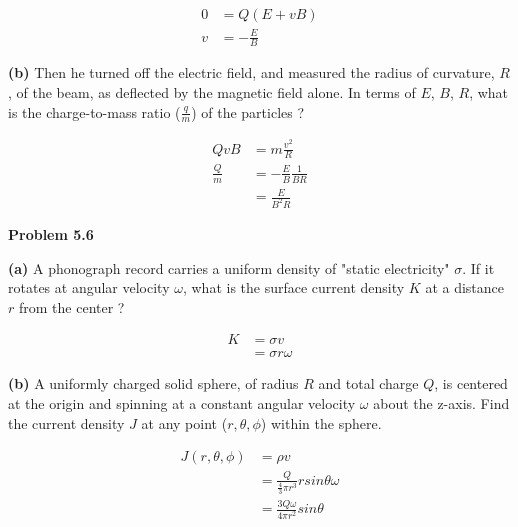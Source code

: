 \documentclass{article}
\begin{document}
\begin{equation*}
\begin{split}
	0 & = Q (E + vB) \\
	v & = \boxed{- \frac{E}{B}}
\end{split}
\end{equation*}

\textbf{(b)}
Then he turned off the electric field, and measured the radius of curvature, $R$, of the beam, as deflected by the magnetic field alone.
In terms of $E$, $B$, $R$, what is the charge-to-mass ratio ($\frac{q}{m}$) of the particles ?

\begin{equation*}
\begin{split}
	QvB & = m \frac{v^2}{R} \\
	\frac{Q}{m} & = - \frac{E}{B} \frac{1}{B R} \\
	& = \boxed{\frac{E}{B^2 R}}
\end{split}
\end{equation*}

\textbf{Problem 5.6}

\textbf{(a)}
A phonograph record carries a uniform density of "static electricity" $\sigma$.
If it rotates at angular velocity $\omega$, what is the surface current density $K$ at a distance $r$ from the center ?

\begin{equation*}
\begin{split}
	K & = \sigma v \\
	& = \boxed{\sigma r \omega}
\end{split}
\end{equation*}


\textbf{(b)}
A uniformly charged solid sphere, of radius $R$ and total charge $Q$, is centered at the origin and spinning at a constant angular velocity $\omega$ about the z-axis.
Find the current density $J$ at any point ($r, \theta, \phi$) within the sphere.

\begin{equation*}
\begin{split}
	J (r, \theta, \phi) & = \rho v \\
	& = \frac{Q}{\frac{4}{3} \pi r^3} r sin\theta \omega \\
	& = \boxed{\frac{3 Q \omega}{4 \pi r^2} sin\theta}
\end{split}
\end{equation*}
\end{document}
